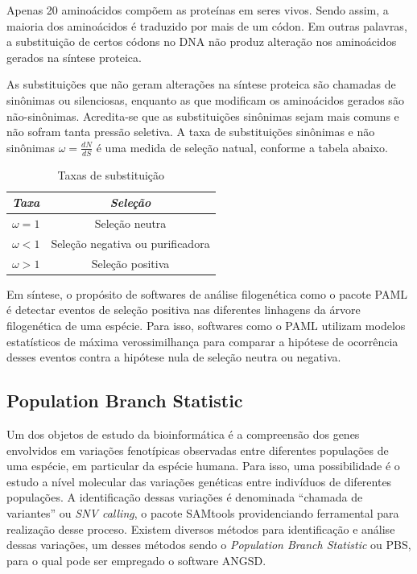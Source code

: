 \documentclass[cic,tc]{iiufrgs}
\begin{document}
Apenas 20 aminoácidos compõem as proteínas em seres vivos. Sendo assim, a
maioria dos aminoácidos é traduzido por mais de um códon. Em outras palavras, a
substituição de certos códons no DNA não produz alteração nos aminoácidos
gerados na síntese proteica.

As substituições que não geram alterações na síntese proteica são chamadas de
sinônimas ou silenciosas, enquanto as que modificam os aminoácidos gerados são
não-sinônimas. Acredita-se que as substituições sinônimas sejam mais comuns e
não sofram tanta pressão seletiva. A taxa de substituições sinônimas e não
sinônimas $\omega = \frac{dN}{dS}$ é uma medida de seleção natual, conforme a
tabela abaixo.\cite{yang2002codon}

\begin{table}[h]
    \caption{Taxas de substituição}
    \centering
        \begin{tabular}{c|c}
          \hline
          \textit{Taxa}  &   \textit{Seleção} \\
          \hline
          \hline
          $\omega = 1$ & Seleção neutra \\
          $\omega < 1$ & Seleção negativa ou purificadora \\
          $\omega > 1$ & Seleção positiva \\
          \hline
        \end{tabular}
    \label{tbl:ex1}
\end{table}

Em síntese, o propósito de softwares de análise filogenética como o pacote PAML
é detectar eventos de seleção positiva nas diferentes linhagens da árvore
filogenética de uma espécie. Para isso, softwares como o PAML utilizam modelos
estatísticos de máxima verossimilhança para comparar a hipótese de ocorrência
desses eventos contra a hipótese nula de seleção neutra ou
negativa.\cite{moretti2012gcodeml}

\subsection{Population Branch Statistic}
\label{sec:pbs}

Um dos objetos de estudo da bioinformática é a compreensão dos genes envolvidos
em variações fenotípicas observadas entre diferentes populações de uma
espécie, em particular da espécie humana.\cite{jiang2019population} Para isso,
uma possibilidade é o estudo a nível molecular das variações genéticas entre
indivíduos de diferentes populações. A identificação dessas variações é
denominada ``chamada de variantes'' ou \textit{SNV calling}, o pacote SAMtools
providenciando ferramental para realização desse
proceso.\cite{pirooznia2014validation} Existem diversos métodos para
identificação e análise dessas variações, um desses métodos sendo o
\textit{Population Branch Statistic} ou PBS,\cite{jiang2019population} para o
qual pode ser empregado o software ANGSD.
\end{document}
